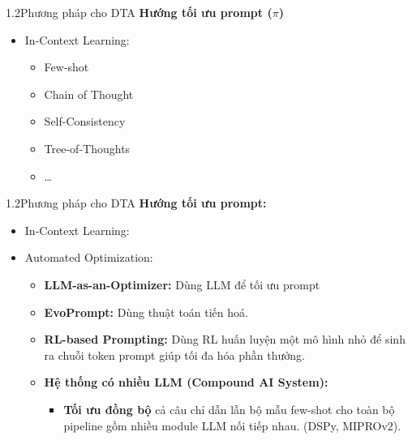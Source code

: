 \begin{frame}{1.2\quad Phương pháp cho DTA}
  \textbf{Hướng tối ưu prompt ($\pi$)}
  \begin{itemize}\tightlist
    \item In-Context Learning:
      \begin{itemize}\setlength{\itemsep}{0.3em}\normalsize
        \item Few-shot
        \item Chain of Thought
        \item Self-Consistency
        \item Tree-of-Thoughts
        \item \dots
      \end{itemize}
  \end{itemize}
\end{frame}

\begin{frame}{1.2\quad Phương pháp cho DTA}
  \textbf{Hướng tối ưu prompt:}
  \begin{itemize}\tightlist
    \item In-Context Learning:
    \item Automated Optimization:
      \begin{itemize}\tightlist\normalsize
        \item {\color{Amber!80!black}\textbf{LLM-as-an-Optimizer:}} Dùng LLM để tối ưu prompt
        \item {\color{Amber!80!black}\textbf{EvoPrompt:}} Dùng thuật toán tiến hoá.
        \item {\color{Amber!80!black}\textbf{RL-based Prompting:}} Dùng RL huấn luyện một mô hình
              nhỏ để sinh ra chuỗi token prompt giúp tối đa hóa phần thưởng.
        \item {\color{Amber!80!black}\textbf{Hệ thống có nhiều LLM (Compound AI System):}}
          \begin{itemize}\tightlist\normalsize
            \item \textbf{Tối ưu đồng bộ} cả câu chỉ dẫn lẫn bộ mẫu few-shot cho toàn bộ
                  pipeline gồm nhiều module LLM nối tiếp nhau. (DSPy, MIPROv2).
          \end{itemize}
      \end{itemize}
  \end{itemize}
\end{frame}

